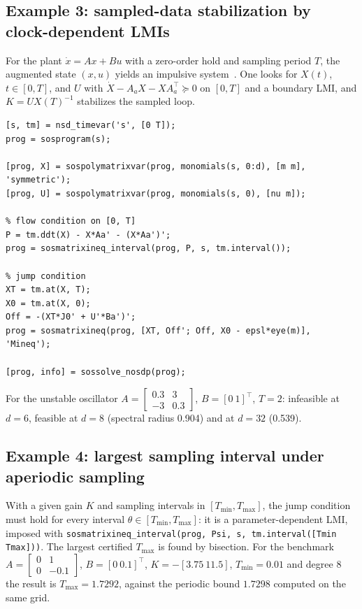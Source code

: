 \documentclass[11pt,a4paper]{article}
\newcommand{\code}[1]{\texttt{#1}}
\begin{document}
\subsection{Example 3: sampled-data stabilization by clock-dependent LMIs}
For the plant $\dot x=Ax+Bu$ with a zero-order hold and sampling period $T$, the augmented state $(x,u)$ yields an impulsive system~\cite{Briat2013,Briat2021}. One looks for $X(t)$, $t\in[0,T]$, and $U$ with $\dot X-A_aX-XA_a^\top\succeq0$ on $[0,T]$ and a boundary LMI, and $K=UX(T)^{-1}$ stabilizes the sampled loop.
\begin{lstlisting}
[s, tm] = nsd_timevar('s', [0 T]);
prog = sosprogram(s);

[prog, X] = sospolymatrixvar(prog, monomials(s, 0:d), [m m], 'symmetric');
[prog, U] = sospolymatrixvar(prog, monomials(s, 0), [nu m]);

% flow condition on [0, T]
P = tm.ddt(X) - X*Aa' - (X*Aa')';
prog = sosmatrixineq_interval(prog, P, s, tm.interval());

% jump condition
XT = tm.at(X, T);
X0 = tm.at(X, 0);
Off = -(XT*J0' + U'*Ba')';
prog = sosmatrixineq(prog, [XT, Off'; Off, X0 - epsl*eye(m)], 'Mineq');

[prog, info] = sossolve_nosdp(prog);
\end{lstlisting}
For the unstable oscillator $A=\begin{bmatrix}0.3&3\\-3&0.3\end{bmatrix}$, $B=[0\ 1]^\top$, $T=2$: infeasible at $d=6$, feasible at $d=8$ (spectral radius 0.904) and at $d=32$ (0.539).

\subsection{Example 4: largest sampling interval under aperiodic sampling}
With a given gain $K$ and sampling intervals in $[T_{\min},T_{\max}]$, the jump condition must hold for every interval $\theta\in[T_{\min},T_{\max}]$: it is a parameter-dependent LMI, imposed with \code{sosmatrixineq\_interval(prog, Psi, s, tm.interval([Tmin Tmax]))}. The largest certified $T_{\max}$ is found by bisection. For the benchmark $A=\begin{bmatrix}0&1\\0&-0.1\end{bmatrix}$, $B=[0\ 0.1]^\top$, $K=-[3.75\ 11.5]$, $T_{\min}=0.01$ and degree 8 the result is $T_{\max}=1.7292$, against the periodic bound $1.7298$ computed on the same grid.
\end{document}
